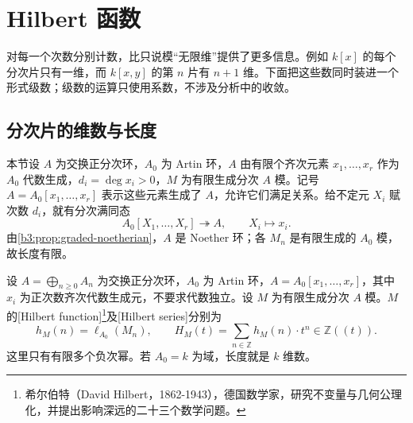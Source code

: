 
\section{Hilbert 函数}
\label{b3:sec:1102}

对每一个次数分别计数，比只说模“无限维”提供了更多信息。例如 \(k[x]\) 的每个分次片只有一维，而 \(k[x,y]\) 的第 \(n\) 片有 \(n+1\) 维。下面把这些数同时装进一个形式级数；级数的运算只使用系数，不涉及分析中的收敛。

\subsection{分次片的维数与长度}
\label{b3:subsec:1102:01}

本节设 \(A\) 为交换正分次环，\(A_0\) 为 Artin 环，\(A\) 由有限个齐次元素 \(x_1,\ldots,x_r\) 作为 \(A_0\) 代数生成，\(d_i=\deg x_i>0\)，\(M\) 为有限生成分次 \(A\) 模。记号 \(A=A_0[x_1,\ldots,x_r]\) 表示这些元素生成了 \(A\)，允许它们满足关系。给不定元 \(X_i\) 赋次数 \(d_i\)，就有分次满同态
\[
	A_0[X_1,\ldots,X_r]\twoheadrightarrow A, \qquad X_i\longmapsto x_i.
\]
由\cref{b3:prop:graded-noetherian}，\(A\) 是 Noether 环；各 \(M_n\) 是有限生成的 \(A_0\) 模，故长度有限。

\begin{definition}\label{b3:def:hilbert-function-series}
	设 \(A=\bigoplus_{n\ge0}A_n\) 为交换正分次环，\(A_0\) 为 Artin 环，\(A=A_0[x_1,\ldots,x_r]\)，其中 \(x_i\) 为正次数齐次代数生成元，不要求代数独立。设 \(M\) 为有限生成分次 \(A\) 模。\(M\) 的[Hilbert function]\footnote{希尔伯特（David Hilbert，1862-1943），德国数学家，研究不变量与几何公理化，并提出影响深远的二十三个数学问题。}及[Hilbert series]分别为
	\[
		h_M(n)=\ell_{A_0}(M_n),\qquad H_M(t)=\sum_{n\in\mathbb Z}h_M(n)\cdot t^n\in\mathbb Z(\!(t)\!).
	\]
	这里只有有限多个负次幂。若 \(A_0=k\) 为域，长度就是 \(k\) 维数。
\end{definition}

